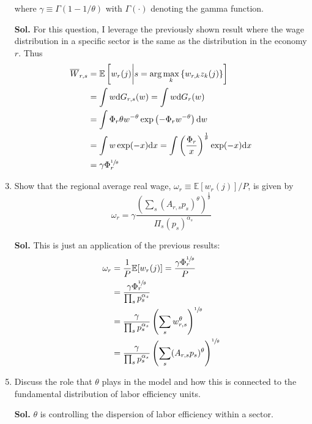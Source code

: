 \documentclass[12pt,oneside,reqno]{amsart}
\newcommand{\E}{\mathbb{E}}
\begin{document}
\begin{enumerate}[leftmargin=15pt,label=\textbf{\roman*.}]
\begin{equation*}
    \end{equation*}
    where $\gamma \equiv \Gamma(1-1 / \theta)$ with $\Gamma(\cdot)$ denoting the gamma function.
    \item[\textbf{Sol.}] For this question, I leverage the previously shown result where the wage distribution in a specific sector is the same as the distribution in the economy $r$. Thus
    \begin{align*}
        \overline{W}_{r,s} &= \E\left[w_r(j)\bigg\vert s=\arg \max_{k}\left\{w_{r, k} z_{k}(j)\right\} \right] \\ 
                           &= \int w\mathrm{d}G_{r,s}(w) 
                           = \int w\mathrm{d}G_r(w) \\ 
                           &= \int \Phi_r\theta w^{-\theta}\exp\left(-\Phi_r w^{-\theta}\right)\mathrm{d}w \\ 
                           &= \int w \exp(-x)\mathrm{d}x = \int \left(\frac{\Phi_r}{x} \right)^{\frac{1}{\theta}} \exp(-x)\mathrm{d}x \\ 
                           &= \gamma\Phi_r^{\sfrac{1}{\theta}}
    \end{align*}
    \item Show that the regional average real wage, $\omega_{r} \equiv \mathbb{E}\left[w_{r}(j)\right] / P$, is given by
    \begin{equation*}
        \omega_{r}=\gamma \frac{\left(\sum_{s}\left(A_{r, s} p_{s}\right)^{\theta}\right)^{\frac{1}{\theta}}}{\Pi_{s}\left(p_{s}\right)^{\alpha_{s}}}
    \end{equation*}
    \item[\textbf{Sol.}] This is just an application of the previous results:
    \begin{align*}
        \omega_r &= \frac{1}{P}\E[w_r(j)] = \frac{\gamma\Phi_r^{\sfrac{1}{\theta}}}{P} \\ 
        &= \frac{\gamma\Phi_r^{\sfrac{1}{\theta}}}{\prod_s p_s^{\alpha_s}} \\ 
        &= \frac{\gamma}{\prod_s p_s^{\alpha_s}} \left(\sum_sw_{r,s}^{\theta}\right)^{\sfrac{1}{\theta}} \\ 
        &= \frac{\gamma}{\prod_s p_s^{\alpha_s}} \left(\sum_s(A_{r,s}p_s)^{\theta}\right)^{\sfrac{1}{\theta}}
    \end{align*}
\item Discuss the role that $\theta$ plays in the model and how this is connected to the fundamental distribution of labor efficiency units.
\item[\textbf{Sol.}] $\theta$ is controlling the dispersion of labor efficiency within a sector. 
\end{enumerate}
\end{document}
